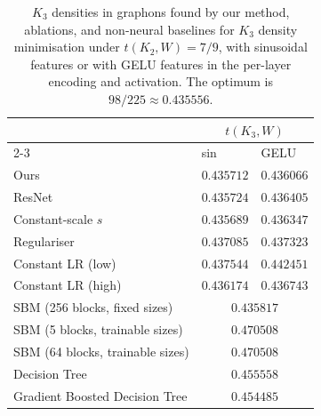 \documentclass[11pt]{article}
\theoremstyle{plain}
\theoremstyle{definition}
\theoremstyle{remark}
\begin{document}
\begin{table}[t]
  \centering
  \caption{$K_3$ densities in graphons found by our method, ablations, and non-neural baselines for $K_3$ density minimisation under $t(K_2, W)=7/9$, with sinusoidal features or with GELU features in the per-layer encoding and activation. The optimum is $98/225 \approx 0.435556$.  \label{tab:ablationstudy}}
  {\small
  \begin{tabular}{lll}
  \toprule
                     & \multicolumn{2}{c}{$t(K_3, W)$} \\
  \cmidrule(lr){2-3}
                     & sin & GELU \\
  \midrule
  Ours                                     & $0.435712$ & $0.436066$ \\
  ResNet                                   & $0.435724$ & $0.436405$ \\
  Constant-scale $s$                       & $0.435689$ & $0.436347$ \\
  Regulariser                              & $0.437085$ & $0.437323$ \\
  Constant LR (low)                        & $0.437544$ & $0.442451$ \\
  Constant LR (high)                       & $0.436174$ & $0.436743$ \\
  \midrule
  SBM (256 blocks, fixed sizes)            & \multicolumn{2}{c}{$0.435817$} \\
  SBM (5 blocks, trainable sizes)          & \multicolumn{2}{c}{$0.470508$} \\
  SBM (64 blocks, trainable sizes)         & \multicolumn{2}{c}{$0.470508$} \\
  Decision Tree                            & \multicolumn{2}{c}{$0.455558$} \\
  Gradient Boosted Decision Tree           & \multicolumn{2}{c}{$0.454485$} \\
  \bottomrule
  \end{tabular}
  }
\end{table}
\end{document}
